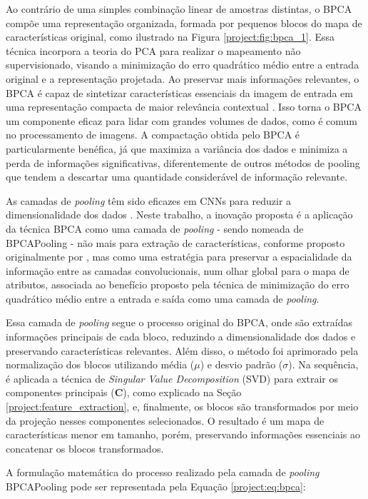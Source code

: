 Ao contrário de uma simples combinação linear de amostras distintas, o BPCA compõe uma representação organizada, formada por pequenos blocos do mapa de características original, como ilustrado na Figura \ref{project:fig:bpca_1}. Essa técnica incorpora a teoria do PCA para realizar o mapeamento não supervisionado, visando a minimização do erro quadrático médio entre a entrada original e a representação projetada. Ao preservar mais informações relevantes, o BPCA é capaz de sintetizar características essenciais da imagem de entrada em uma representação compacta de maior relevância contextual \citep{Kuncheva2014PCAData}. Isso torna o BPCA um componente eficaz para lidar com grandes volumes de dados, como é comum no processamento de imagens. A compactação obtida pelo BPCA é particularmente benéfica, já que maximiza a variância dos dados e minimiza a perda de informações significativas, diferentemente de outros métodos de pooling que tendem a descartar uma quantidade considerável de informação relevante.

As camadas de \textit{pooling} têm sido eficazes em CNNs para reduzir a dimensionalidade dos dados \citep{Paul2019DimensionalityPooling}. Neste trabalho, a inovação proposta é a aplicação da técnica BPCA como uma camada de \textit{pooling} - sendo nomeada de BPCAPooling - não mais para extração de características, conforme proposto originalmente por \cite{Salvadeo2011}, mas como uma estratégia para preservar a espacialidade da informação entre as camadas convolucionais, num olhar global para o mapa de atributos, associada ao benefício proposto pela técnica de minimização do erro quadrático médio entre a entrada e saída como uma camada de \textit{pooling}.

Essa camada de \textit{pooling} segue o processo original do BPCA, onde são extraídas informações principais de cada bloco, reduzindo a dimensionalidade dos dados e preservando características relevantes. Além disso, o método foi aprimorado pela normalização dos blocos utilizando média ($\mu$) e desvio padrão ($\sigma$). Na sequência, é aplicada a técnica de \textit{Singular Value Decomposition} (SVD) para extrair os componentes principais ($\boldsymbol{C}$), como explicado na Seção \ref{project:feature_extraction}, e, finalmente, os blocos são transformados por meio da projeção nesses componentes selecionados. O resultado é um mapa de características menor em tamanho, porém, preservando informações essenciais ao concatenar os blocos transformados.

A formulação matemática do processo realizado pela camada de \textit{pooling} BPCAPooling pode ser representada pela Equação \ref{project:eq:bpca}:

